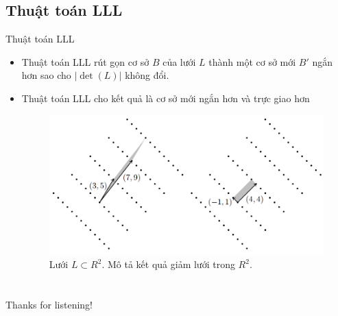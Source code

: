 \documentclass{beamer}
\numberwithin{equation}{section}
\begin{document}
\subsection{Thuật toán LLL}
\begin{frame}{Thuật toán LLL}
\begin{itemize}
\item Thuật toán LLL rút gọn cơ sở $B$ của lưới $L$ thành một cơ sở mới $B'$ ngắn hơn sao cho $|\det(L)|$ không đổi.
\item Thuật toán LLL cho kết quả là cơ sở mới ngắn hơn và trực giao hơn

\begin{figure}[H]
\centering
\includegraphics[scale = 0.5]{pictures/mo_ta_ket_qua_giam_luoi_LLL.png}
\caption{Lưới $L \subset R^2$. Mô tả kết quả giảm lưới trong $R^2$.}
\end{figure}

\end{itemize}
\end{frame}

\section*{}
\begin{frame}{}
\centering
\Huge{Thanks for listening!}
\end{frame}
\end{document}
